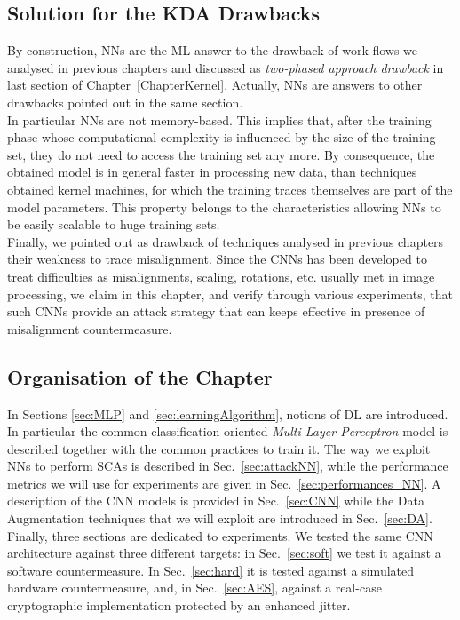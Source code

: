 \subsection*{Solution for the KDA Drawbacks}
By construction, NNs are the ML answer to the drawback of work-flows we analysed in previous chapters and discussed as \emph{two-phased approach drawback} in last section of Chapter~\ref{ChapterKernel}. Actually, NNs are answers to other drawbacks pointed out in the same section. \\

In particular NNs are not memory-based. This implies that, after the training phase whose computational complexity is influenced by the size of the training set, they do not need to access the training set any more. By consequence, the obtained model is in general faster in processing new data, than techniques obtained \via kernel machines, for which the training traces themselves are part of the model parameters. This property belongs to the characteristics allowing NNs to be easily scalable to huge training sets.\\

Finally, we pointed out as drawback of techniques analysed in previous chapters their weakness to trace misalignment. Since the CNNs has been developed to treat difficulties as misalignments, scaling, rotations, etc. usually met in image processing,  we claim in this chapter, and verify through various experiments, that such CNNs provide an attack strategy that can keeps effective in presence of misalignment countermeasure. 

\subsection*{Organisation of the Chapter}
In Sections \ref{sec:MLP} and \ref{sec:learningAlgorithm}, notions of DL are introduced. In particular the common classification-oriented \emph{Multi-Layer Perceptron} model is described together with the common practices to train it. The way we exploit NNs to perform SCAs is described in Sec.~\ref{sec:attackNN}, while the performance metrics we will use for experiments are given in Sec.~\ref{sec:performances_NN}. A description of the CNN models is provided in Sec.~\ref{sec:CNN} while the Data Augmentation techniques that we will exploit are introduced in Sec.~\ref{sec:DA}.  Finally, three sections are dedicated to experiments. We tested the same CNN architecture against three different targets: in Sec.~\ref{sec:soft} we test it against a software countermeasure. In Sec.~\ref{sec:hard} it is tested against a simulated hardware countermeasure, and, in Sec.~\ref{sec:AES}, against a real-case cryptographic implementation protected by an enhanced jitter. 


